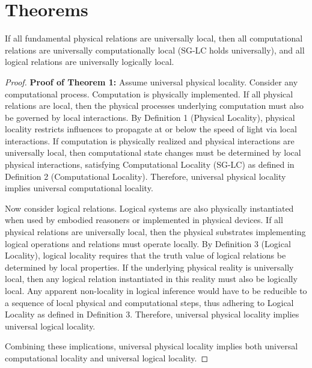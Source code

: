 \section{Theorems}

\begin{theorem}
	If all fundamental physical relations are universally local, then all computational relations are universally computationally local (SG-LC holds universally), and all logical relations are universally logically local.
\end{theorem}
\begin{proof}
	\textbf{Proof of Theorem 1:} Assume universal physical locality. Consider any computational process. Computation is physically implemented. If all physical relations are local, then the physical processes underlying computation must also be governed by local interactions. By Definition 1 (Physical Locality), physical locality restricts influences to propagate at or below the speed of light via local interactions. If computation is physically realized and physical interactions are universally local, then computational state changes must be determined by local physical interactions, satisfying Computational Locality (SG-LC) as defined in Definition 2 (Computational Locality). Therefore, universal physical locality implies universal computational locality.
	
	Now consider logical relations. Logical systems are also physically instantiated when used by embodied reasoners or implemented in physical devices. If all physical relations are universally local, then the physical substrates implementing logical operations and relations must operate locally. By Definition 3 (Logical Locality), logical locality requires that the truth value of logical relations be determined by local properties. If the underlying physical reality is universally local, then any logical relation instantiated in this reality must also be logically local. Any apparent non-locality in logical inference would have to be reducible to a sequence of local physical and computational steps, thus adhering to Logical Locality as defined in Definition 3. Therefore, universal physical locality implies universal logical locality.
	
	Combining these implications, universal physical locality implies both universal computational locality and universal logical locality.
\end{proof}

